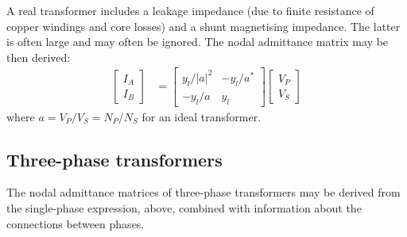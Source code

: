 \documentclass[11pt]{article}
\begin{document}
A real transformer includes a leakage impedance (due to finite resistance of copper windings and core losses) and a shunt magnetising impedance. The latter is often large and may often be ignored. The nodal admittance matrix may be then derived:
\begin{align}
\begin{bmatrix}I_A \\ I_B \end{bmatrix} &= 
\begin{bmatrix}y_l/|a|^2 & -y_l/a^* \\ -y_l/a & y_l\end{bmatrix}
\begin{bmatrix}V_P \\ V_S \end{bmatrix}
\end{align}
where $a = V_P / V_S = N_P / N_S$ for an ideal transformer.

\subsection{Three-phase transformers}
The nodal admittance matrices of three-phase transformers may be derived from the single-phase expression, above, combined with information about the connections between phases.
\end{document}
